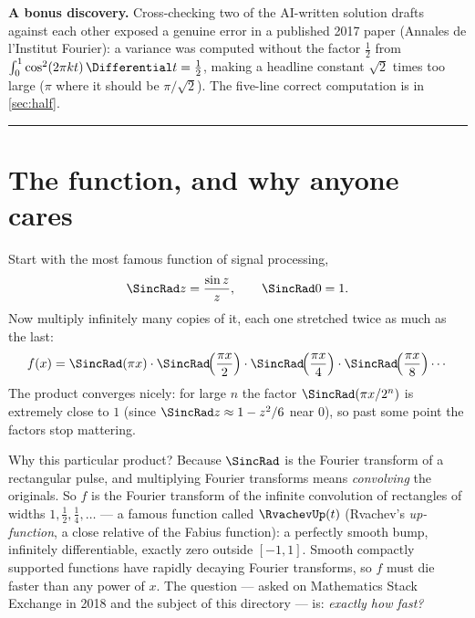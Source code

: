 \documentclass[11pt,oneside]{article}
\theoremstyle{remark}
\begin{document}
\textbf{A bonus discovery.}  Cross-checking two of the AI-written
solution drafts against each other exposed a genuine error in a
published 2017 paper (Annales de l'Institut Fourier): a variance was
computed without the factor $\tfrac12$ from
$\int_0^1\cos^2(2\pi kt)\,\Differential t=\tfrac12$, making a headline constant
$\sqrt2$ times too large ($\pi$ where it should be $\pi/\sqrt2$).
The five-line correct computation is in \cref{sec:half}.
\par\vspace{0.9em}\hrule

\tableofcontents

\section{The function, and why anyone cares}

Start with the most famous function of signal processing,
\[
 \SincRad z=\frac{\sin z}{z},\qquad\SincRad 0=1 .
\]
Now multiply infinitely many copies of it, each one stretched twice as
much as the last:
\[
 f(x)=\SincRad(\pi x)\cdot\SincRad\!\Bigl(\frac{\pi x}{2}\Bigr)\cdot
 \SincRad\!\Bigl(\frac{\pi x}{4}\Bigr)\cdot
 \SincRad\!\Bigl(\frac{\pi x}{8}\Bigr)\cdots
\]
The product converges nicely: for large $n$ the factor
$\SincRad(\pi x/2^n)$ is extremely close to $1$ (since $\SincRad z\approx
1-z^2/6$ near $0$), so past some point the factors stop mattering.

Why this particular product?  Because $\SincRad$ is the Fourier transform
of a rectangular pulse, and multiplying Fourier transforms means
\emph{convolving} the originals.  So $f$ is the Fourier transform of
the infinite convolution of rectangles of widths $1,\tfrac12,\tfrac14,
\dots$ --- a famous function called $\RvachevUp(t)$ (Rvachev's
\emph{up-function}, a close relative of the Fabius function): a
perfectly smooth bump, infinitely differentiable, exactly zero outside
$[-1,1]$.  Smooth compactly supported functions have rapidly decaying
Fourier transforms, so $f$ must die faster than any power of $x$.  The
question --- asked on Mathematics Stack Exchange in 2018 and the subject
of this directory --- is: \emph{exactly how fast?}
\end{document}

